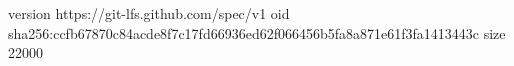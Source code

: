 version https://git-lfs.github.com/spec/v1
oid sha256:ccfb67870c84acde8f7c17fd66936ed62f066456b5fa8a871e61f3fa1413443c
size 22000
